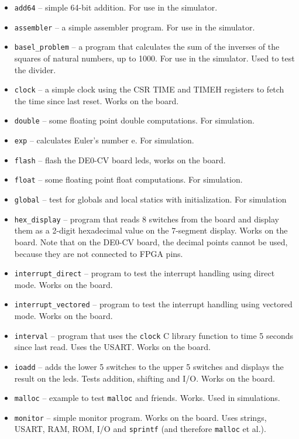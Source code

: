 \documentclass[12pt]{article}
\begin{document}
\begin{itemize}
\item \texttt{add64} -- simple 64-bit addition. For use in the simulator.
\item \texttt{assembler} -- a simple assembler program. For use in the simulator.
\item \texttt{basel\_problem} -- a program that calculates the sum of the inverses of the squares of natural numbers, up to 1000. For use in the simulator. Used to test the divider.
\item \texttt{clock} -- a simple clock using the CSR TIME and TIMEH registers to fetch the time since last reset. Works on the board.
\item \texttt{double} -- some floating point double computations. For simulation.
\item \texttt{exp} -- calculates Euler's number e. For simulation.
\item \texttt{flash} -- flash the DE0-CV board leds, works on the board.
\item \texttt{float} -- some floating point float computations. For simulation.
\item \texttt{global} -- test for globals and local statics with initialization. For simulation
\item \texttt{hex\_display} -- program that reads 8 switches from the board and display them as a 2-digit hexadecimal value on the 7-segment display. Works on the board. Note that on the DE0-CV board, the decimal points cannot be used, because they are not connected to FPGA pins.
\item \texttt{interrupt\_direct} -- program to test the interrupt handling using direct mode. Works on the board.
\item \texttt{interrupt\_vectored} -- program to test the interrupt handling using vectored mode. Works on the board.
\item \texttt{interval} -- program that uses the \texttt{clock} C library function to time 5 seconds since last read. Uses the USART. Works on the board.
\item \texttt{ioadd} -- adds the lower 5 switches to the upper 5 switches and displays the result on the leds. Tests addition, shifting and I/O. Works on the board.
\item \texttt{malloc} -- example to test \texttt{malloc} and friends. Works. Used in simulations.
\item \texttt{monitor} -- simple monitor program. Works on the board. Uses strings, USART, RAM, ROM, I/O and \texttt{sprintf} (and therefore \texttt{malloc} et al.).

\end{itemize}
\end{document}
